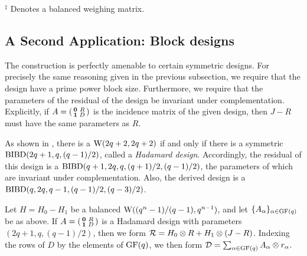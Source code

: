 \documentclass[../../../main]{subfiles}
\begin{document}
$^\ddag$ Denotes a balanced weighing matrix.

\dinkus

\subsection{A Second Application: Block designs}

The construction is perfectly amenable to certain symmetric designs. For precisely the same reasoning given in the previous subsection, we require that the design have a prime power block size. Furthermore, we require that the parameters of the residual of the design be invariant under complementation. Explicitly, if $A = \left(\begin{smallmatrix} \mathbf{0} & R \\ \mathbf{1} & D \end{smallmatrix}\right)$ is the incidence matrix of the given design, then $J-R$ must have the same parameters as $R$.

As shown in \cite{combinatorial-theory}, there is a $\text{W}(2q+2,2q+2)$ if and only
if there is a symmetric $\text{BIBD}(2q+1,q,(q-1)/2)$, called a {\it Hadamard
  design}. Accordingly, the
residual of this design is a $\text{BIBD}(q+1,2q,q,(q+1)/2,(q-1)/2)$, the parameters
of which are invariant under complementation. Also, the derived design is a
$\text{BIBD}(q,2q,q-1,(q-1)/2,(q-3)/2)$. 

Let $H=H_0-H_1$ be a balanced $\text{W}((q^n-1)/(q-1),q^{n-1})$, and let $\{A_\alpha\}_{\alpha\in\text{GF}(q)}$ be as above. If $A = \left(\begin{smallmatrix} \mathbf{0} & R \\ \mathbf{1} & D \end{smallmatrix}\right)$ is a Hadamard design with parameters $(2q+1,q,(q-1)/2)$, then we form $\mathcal{R} = H_0 \otimes R + H_1 \otimes (J-R)$. Indexing the rows of $D$ by the elements of $\text{GF}(q)$, we then form $\mathcal{D} = \sum_{\alpha\in\text{GF}(q)} A_\alpha \otimes r_\alpha$.
\end{document}
